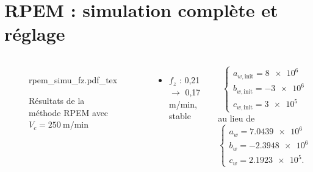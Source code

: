 \documentclass{style/presentation}
\begin{document}
\section{RPEM : simulation complète et réglage}
\begin{frame}
    \begin{columns}[c]
        \begin{figure}
            \centering
            {\fontsize{3.5pt}{5pt}\selectfont
                \def\svgwidth{\textwidth}
                {rpem_simu_fz.pdf_tex}}
            \caption{Résultats de la méthode RPEM avec $V_c=\SI{250}{\meter\per\minute}$}
        \end{figure}
        \begin{itemize}
            \item $f_z$ : 0,21 $\rightarrow$ \alert{0,17\,m/min}, stable
        \end{itemize}
        \begin{equation*}
            \left\{
            \begin{array}{l}
                a_{w,\text{init}} = \num{8e6}  \\
                b_{w,\text{init}} = \num{-3e6} \\
                c_{w,\text{init}} = \num{3e5}
            \end{array}
            \right.
        \end{equation*}
        au lieu de
        \begin{equation*}
            \left\{
            \begin{array}{l}
                a_{w} = \num{7.0439e6}  \\
                b_{w} = \num{-2.3948e6} \\
                c_{w} = \num{2.1923e5}.
            \end{array}
            \right.
        \end{equation*}
    \end{columns}
\end{frame}
\end{document}

